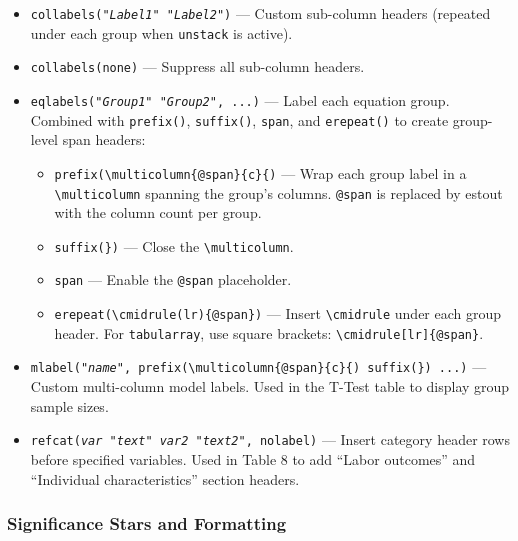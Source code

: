 \documentclass[11pt]{article}
\numberwithin{table}{section}
\begin{document}
\begin{itemize}
    \item \texttt{collabels("\emph{Label1}" "\emph{Label2}")} --- Custom sub-column headers (repeated under each group when \texttt{unstack} is active).
    \item \texttt{collabels(none)} --- Suppress all sub-column headers.
    \item \texttt{eqlabels("\emph{Group1}" "\emph{Group2}", ...)} --- Label each equation group. Combined with \texttt{prefix()}, \texttt{suffix()}, \texttt{span}, and \texttt{erepeat()} to create group-level span headers:
    \begin{itemize}
        \item \texttt{prefix(\textbackslash multicolumn\{@span\}\{c\}\{)} --- Wrap each group label in a \texttt{\textbackslash multicolumn} spanning the group's columns. \texttt{@span} is replaced by estout with the column count per group.
        \item \texttt{suffix(\})} --- Close the \texttt{\textbackslash multicolumn}.
        \item \texttt{span} --- Enable the \texttt{@span} placeholder.
        \item \texttt{erepeat(\textbackslash cmidrule(lr)\{@span\})} --- Insert \texttt{\textbackslash cmidrule} under each group header. For \texttt{tabularray}, use square brackets: \texttt{\textbackslash cmidrule[lr]\{@span\}}.
    \end{itemize}
    \item \texttt{mlabel("\emph{name}", prefix(\textbackslash multicolumn\{@span\}\{c\}\{) suffix(\}) ...)} --- Custom multi-column model labels. Used in the T-Test table to display group sample sizes.
    \item \texttt{refcat(\emph{var} "\emph{text}" \emph{var2} "\emph{text2}", nolabel)} --- Insert category header rows before specified variables. Used in Table 8 to add ``Labor outcomes'' and ``Individual characteristics'' section headers.
\end{itemize}

\subsubsection{Significance Stars and Formatting}
\end{document}
